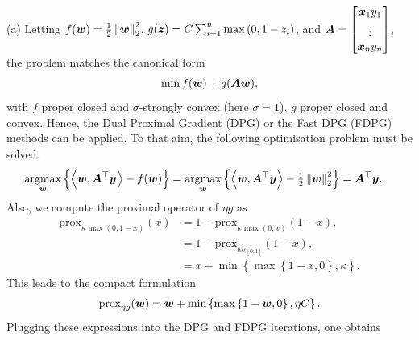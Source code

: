 \indent (a) Letting $f(\boldsymbol w) = {\textstyle\frac{1}{2}}\left\lVert\boldsymbol w\right\rVert_{2}^2$, $g(\boldsymbol z) = C\sum_{i=1}^n\max\left(0,1-z_i\right)$, and $\boldsymbol A = \begin{bmatrix}
	\boldsymbol x_1y_1\\ \vdots \\ \boldsymbol x_ny_n
\end{bmatrix}$, the problem matches the canonical form 
\begin{align*}
	\min f(\boldsymbol w) + g(\boldsymbol{Aw}),
\end{align*}
with $f$ proper closed and $\sigma$-strongly convex (here $\sigma=1$), $g$ proper closed and convex. Hence, the Dual Proximal Gradient (DPG) or the Fast DPG (FDPG) methods can be applied. To that aim,
the following optimisation problem must be solved. 
\begin{align*}
	\underset{\boldsymbol w}{\text{argmax}} \left\{\left \langle \boldsymbol w, \boldsymbol A^\top \boldsymbol y \right \rangle - f(\boldsymbol w)\right\} &= \underset{\boldsymbol w}{\text{argmax}} \left\{\left \langle \boldsymbol w, \boldsymbol A^\top \boldsymbol y \right \rangle - {\textstyle\frac{1}{2}}\left\lVert\boldsymbol w\right\rVert_{2}^2 \right\} = \boldsymbol A^\top \boldsymbol y. 
\end{align*}
Also, we compute the proximal operator of $\eta g$ as 
\begin{align*}
	\text{prox}_{\kappa \max(0,1-x)}(x) &= 1-\text{prox}_{\kappa \max(0,x)}(1-x),\\
	&= 1-\text{prox}_{\kappa \sigma_{[0;1]}}(1-x),\\
	&= x+\min\left\{\max\left\{1-x,0\right\},\kappa\right\}.
\end{align*}
This leads to the compact formulation 
\begin{align*}
	\text{prox}_{\eta g}(\boldsymbol w)= \boldsymbol w+\min\left\{\max\left\{1-\boldsymbol w,0\right\},\eta C\right\}.
\end{align*}
Plugging these expressions into the DPG and FDPG  iterations, one obtains 
